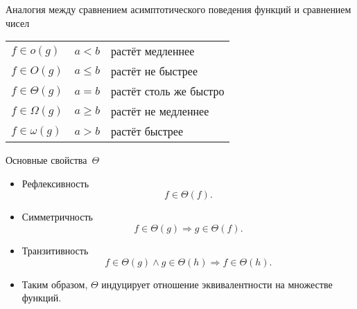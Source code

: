 \documentclass[landscape]{slides}
\begin{document}
\begin{slide}
  Аналогия между сравнением асимптотического поведения функций и сравнением чисел
  \begin{center}
    \renewcommand{\arraystretch}{2}
    \begin{tabular}{lcl}
      $f\in o(g)$      & $a < b$         & растёт медленнее\\
      $f\in O(g)$      & $a \leqslant b$ & растёт не быстрее\\
      $f\in \Theta(g)$ & $a = b$         & растёт столь же быстро\\
      $f\in \Omega(g)$ & $a \geqslant b$ & растёт не медленнее\\
      $f\in \omega(g)$ & $a > b$         & растёт быстрее
    \end{tabular}
  \end{center}
\end{slide}

\begin{slide}
  Основные свойства~$\Theta$
  \begin{itemize}
    \item Рефлексивность
      \[
        f\in \Theta(f) .
      \]
    \item Симметричность
      \[
        f\in \Theta(g) \Rightarrow g\in \Theta(f) .
      \]
    \item Транзитивность
      \[
        f\in \Theta(g) \land g\in \Theta(h) \Rightarrow f\in \Theta(h) .
      \]
    \item Таким образом, $\Theta$ индуцирует отношение эквивалентности на множестве функций.
  \end{itemize}
\end{slide}
\end{document}
